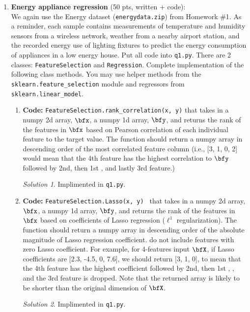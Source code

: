 \documentclass[a4paper,12pt]{article}
\theoremstyle{definition}
\theoremstyle{remark}
\newtheorem*{solution}{Solution}
\begin{document}
	\begin{enumerate}
		\item {\bf Energy appliance regression} (50 pts, written + code):\\
		We again use the Energy dataset ({\tt energydata.zip}) from Homework \#1. As a reminder, each sample contains
		measurements of temperature and humidity sensors from a wireless network, weather from a nearby airport station,
		and the recorded energy use of lighting fixtures to predict the energy consumption of appliances in a low energy
		house. Put all code into \texttt{q1.py}. There are 2 classes: \texttt{FeatureSelection} and \texttt{Regression}. Complete implementation of the following class methods. You may use helper methods from the {\tt sklearn.feature\_selection} module and regressors from {\tt sklearn.linear\_model}.
		\begin{enumerate}
			\item {\bf Code:} {\tt FeatureSelection.rank\_correlation(x, y)} that takes in a numpy 2d array, $\bfx$, a numpy 1d array, $\bfy$, and returns the rank of the features in $\bfx$ based on Pearson correlation of each individual feature to the target value. The function should return a numpy array in descending order of the most correlated feature column (i.e., [3, 1,
			0, 2] would mean that the 4th feature has the highest correlation to $\bfy$ followed by 2nd, then 1st , and lastly 3rd
			feature.)
			\begin{solution}
				Implimented in \texttt{q1.py}.
			\end{solution}
			\item {\bf Code:} {\tt FeatureSelection.Lasso(x, y) } that takes in a numpy 2d array, $\bfx$, a numpy 1d array, $\bfy$, and returns the rank of the features in $\bfx$ based on coefficients of Lasso regression ($\ell^1$ regularization). The function should return a numpy array in descending order of the absolute magnitude of Lasso regression coefficient. do not
			include features with zero Lasso coefficient. For example, for 4-features input $\bfX$, if Lasso coefficients are [2.3,
			-4.5, 0, 7.6], we should return [3, 1, 0], to mean that the 4th feature has the highest coefficient followed by 2nd, then 1st , , and the 3rd feature is dropped. Note that the returned array is likely to be shorter than the original
			dimension of $\bfX$.
			\begin{solution}
				Implimented in \texttt{q1.py}.
			\end{solution}

\end{enumerate}
\end{enumerate}
\end{document}
